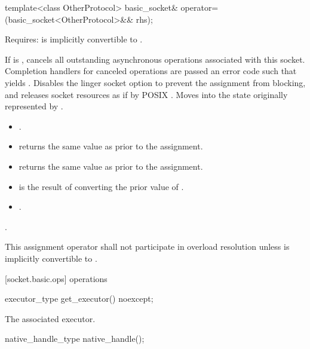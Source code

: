 \begin{itemdecl}
template<class OtherProtocol>
  basic_socket& operator=(basic_socket<OtherProtocol>&& rhs);
\end{itemdecl}

\begin{itemdescr}
\pnum
Requires:  is implicitly convertible to .

\pnum
\effects If  is , cancels all outstanding asynchronous operations associated with this socket. Completion handlers for canceled operations are passed an error code  such that  yields . Disables the linger socket option to prevent the assignment from blocking, and releases socket resources as if by POSIX . Moves into  the state originally represented by .

\pnum
\postconditions 
\begin{itemize}
\item
{}.
\item
{} returns the same value as  prior to the assignment.
\item
{} returns the same value as  prior to the assignment.
\item
{} is the result of converting the prior value of .
\item
{}.
\end{itemize}

\pnum
\returns {}.

\pnum
\remarks This assignment operator shall not participate in overload resolution unless  is implicitly convertible to .
\end{itemdescr}



[socket.basic.ops]{ operations}

\begin{itemdecl}
executor_type get_executor() noexcept;
\end{itemdecl}

\begin{itemdescr}
\pnum
\returns The associated executor.
\end{itemdescr}

\begin{itemdecl}
native_handle_type native_handle();
\end{itemdecl}

